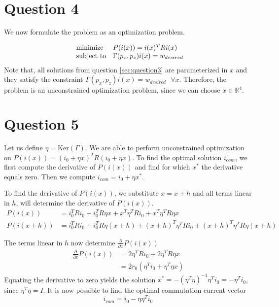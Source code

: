 \documentclass[a4paper,10pt]{article}
\begin{document}
\section{Question 4} \label{sec:question4}
We now formulate the problem as an optimization problem.

\begin{equation}
\begin{array}{ll@{}ll}
\text{minimize}  & P(i(x))=i(x)^TRi(x)\\
\text{subject to}& \Gamma(p_x,p_z)i(x)=w_{desired}
\end{array}
\end{equation}
Note that, all solutions from question \ref{sec:question3} are parameterized in $x$ and they satisfy the constraint $\Gamma(p_x,p_z)i(x)=w_{desired}\text{ } \forall x$. Therefore, the problem is an unconstrained optimization problem, since we can choose $x \in \mathbb{R}^4$. 


\section{Question 5} \label{sec:question5}
Let us define $\eta = \text{Ker}(\Gamma)$. We are able to perform unconstrained optimization on $P(i(x)) = (i_0+\eta x)^T R (i_0+\eta x)$. To find the optimal solution $i_{com}$, we first compute the derivative of $P(i(x))$ and find for which $x^*$ the derivative equals zero. Then we compute $i_{com} = i_0 + \eta x^*$.

To find the derivative of $P(i(x))$, we substitute $x = x+h$ and all terms linear in $h$, will determine the derivative of $P(i(x))$.
\begin{align}
    P(i(x)) &= i_0^T R i_0 + i_0^T R \eta x + x^T\eta^TR i_0 + x^T\eta^T R \eta x \\
    P(i(x+h))& = i_0^T R i_0 + i_0^T R \eta (x+h) + (x+h)^T\eta^TR i_0 + (x+h)^T\eta^T R \eta (x+h) 
\end{align}

The terms linear in $h$ now determine $\frac{\partial}{\partial x}P(i(x))$
\begin{align}
    \frac{\partial}{\partial x}P(i(x)) &= 2 \eta^T R i_0 + 2\eta^T R \eta x  \\
    &= 2 r_0(\eta^T i_0+\eta^T \eta x)
\end{align}
Equating the derivative to zero yields the solution $x^* = -(\eta^T\eta)^{-1}\eta^T i_0 = -\eta^T i_0$, since $\eta^T\eta = I$. It is now possible to find the optimal commutation current vector
\begin{equation} \label{eq:i_com1}
    i_{com} = i_0 - \eta \eta^T i_0
\end{equation}
\end{document}

